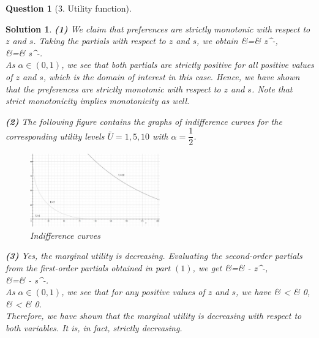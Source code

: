 \documentclass{article} %
\def\eQb#1\eQe{\begin{eqnarray*}#1\end{eqnarray*}}
\theoremstyle{quest}
\newtheorem*{question}{Question}
\newtheorem*{solution}{Solution}
\begin{document}
\begin{question}[3. Utility function]
\end{question}
\begin{solution}
\textbf{(1)} We claim that preferences are strictly monotonic with respect to $z$ and $s$.
Taking the partials with respect to $z$ and $s$, we obtain
\eQb
\dfrac{\partial U}{\partial z} &=&  z^{-}, \\
 &=&  s^{-}. \\
\eQe
As $\alpha \in (0,1)$, we see that both partials are strictly positive for all positive
values of $z$ and $s$, which is the domain of interest in this case. Hence, we have shown
that the preferences are strictly monotonic with respect to $z$ and $s$. Note 
that strict monotonicity implies monotonicity as well.

\pagebreak

\textbf{(2)} 
The following figure contains the graphs of indifference curves for the 
corresponding utility levels $\bar{U} = 1, 5, 10$ with $\alpha = \dfrac{1}{2}$.
\begin{figure}[h!]
  \caption{Indifference curves}
    \centering
  \includegraphics[width=0.5\textwidth]{hw1_indiff.jpg}
\end{figure}


\smallskip

\textbf{(3)} 
Yes, the marginal utility is decreasing. Evaluating the second-order partials
from the first-order partials obtained in part $(1)$, we get
\eQb
\dfrac{\partial^2 U}{\partial z^2} &=& - z^{-}, \\
 &=& - s^{-}. \\
\eQe
As $\alpha \in (0,1)$, we see that for any positive values of $z$ and $s$, we have 
\eQb
\dfrac{\partial^2 U}{\partial z^2} & < & 0, \\
 & < & 0. \\
\eQe
Therefore, we have shown that the marginal utility is decreasing with 
respect to both variables. It is, in fact,
strictly decreasing.


\end{solution}
\end{document}
